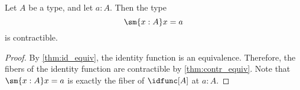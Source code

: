 \begin{cor}
Let $A$ be a type, and let $a:A$. Then the type
\begin{equation*}
\sm{x:A}x=a
\end{equation*}
is contractible.
\end{cor}

\begin{proof}
By \autoref{thm:id_equiv}, the identity function is an equivalence. Therefore, the fibers of the identity function are contractible by \autoref{thm:contr_equiv}. Note that $\sm{x:A}x=a$ is exactly the fiber of $\idfunc[A]$ at $a:A$.
\end{proof}

\begin{comment}
\begin{proof}
We have the term $(a,\refl{a}):\sm{x:A}a=x$, which we take for the center of contraction. To construct the contraction, we have to show that
\begin{equation*}
\prd{p:\sm{x:A}a=x} (a,\refl{a})=p.
\end{equation*}
By the induction principle for dependent pair types it suffices to construct a term of type
\begin{equation*}
\prd{x:A}{p:a=x} (a,\refl{a})=(x,p)
\end{equation*}
Note that we may proceed here by path induction on $p$. That is, it suffices to consider the case $p\jdeq\refl{a}$, and show that $(a,\refl{a})=(a,\refl{a})$. Here we choose $\refl{(a,\refl{a})}$.
\end{proof}
\end{comment}

